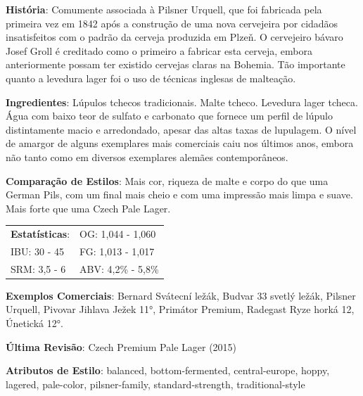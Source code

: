 \textbf{História}: Comumente associada à Pilsner Urquell, que foi fabricada pela primeira vez em 1842 após a construção de uma nova cervejeira por cidadãos insatisfeitos com o padrão da cerveja produzida em Plzeň. O cervejeiro bávaro Josef Groll é creditado como o primeiro a fabricar esta cerveja, embora anteriormente possam ter existido cervejas claras na Bohemia. Tão importante quanto a levedura lager foi o uso de técnicas inglesas de malteação.

\textbf{Ingredientes}: Lúpulos tchecos tradicionais. Malte tcheco. Levedura lager tcheca. Água com baixo teor de sulfato e carbonato que fornece um perfil de lúpulo distintamente macio e arredondado, apesar das altas taxas de lupulagem. O nível de amargor de alguns exemplares mais comerciais caiu nos últimos anos, embora não tanto como em diversos exemplares alemães contemporâneos.

\textbf{Comparação de Estilos}: Mais cor, riqueza de malte e corpo do que uma German Pils, com um final mais cheio e com uma impressão mais limpa e suave. Mais forte que uma Czech Pale Lager.

\begin{tabular}{@{}p{35mm}p{35mm}@{}}
  \textbf{Estatísticas}: & OG: 1,044 - 1,060 \\
  IBU: 30 - 45  & FG: 1,013 - 1,017  \\
  SRM: 3,5 - 6  & ABV: 4,2\% - 5,8\%
\end{tabular}

\textbf{Exemplos Comerciais}: Bernard Svátecní ležák, Budvar 33 svetlý ležák, Pilsner Urquell, Pivovar Jihlava Ježek 11°, Primátor Premium, Radegast Ryze horká 12, Únetická 12°.

\textbf{Última Revisão}: Czech Premium Pale Lager (2015)

\textbf{Atributos de Estilo}: balanced, bottom-fermented, central-europe, hoppy, lagered, pale-color, pilsner-family, standard-strength, traditional-style
